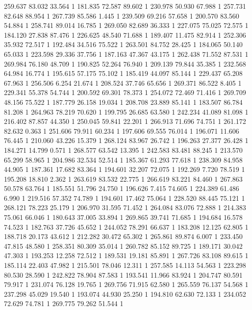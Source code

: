 	259.637	83.032	33.564	1
	181.835	72.587	89.602	1
	230.978	50.930	67.988	1
	257.731	82.648	88.954	1
	267.739	85.586	1.445	1
	239.509	69.216	57.658	1
	200.570	83.560	54.884	1
	258.741	89.014	16.785	1
	269.050	82.689	36.333	1
	227.075	75.025	72.575	1
	184.120	27.838	87.476	1
	226.625	48.540	71.688	1
	189.407	11.475	82.914	1
	252.306	35.932	72.517	1
	192.484	34.516	75.522	1
	263.501	84.752	28.425	1
	184.065	50.140	65.033	1
	223.598	29.336	37.756	1
	187.163	47.367	43.175	1
	262.438	71.552	87.531	1
	269.984	76.180	48.709	1
	190.825	52.264	76.940	1
	209.139	79.844	35.385	1
	232.568	64.984	16.774	1
	195.615	57.175	75.102	1
	185.419	44.097	85.144	1
	229.437	65.208	67.963	1
	256.506	6.254	21.674	1
	208.524	37.746	65.656	1
	269.371	86.522	8.405	1
	229.341	55.378	54.744	1
	200.592	69.301	78.373	1
	254.072	72.469	71.416	1
	269.709	48.156	75.522	1
	187.779	26.158	19.034	1
	208.708	23.889	85.141	1
	183.507	86.784	81.208	1
	264.963	78.219	70.620	1
	199.795	26.685	63.580	1
	242.234	41.089	81.098	1
	216.402	87.857	44.350	1
	250.045	59.841	22.201	1
	266.913	71.696	74.751	1
	261.172	82.632	0.363	1
	251.606	79.911	60.234	1
	197.606	69.555	76.014	1
	196.071	11.606	76.445	1
	210.060	43.226	15.379	1
	268.124	83.967	26.742	1
	196.263	27.377	26.428	1
	184.271	14.799	0.571	1
	268.577	63.542	13.395	1
	242.583	83.481	88.245	1
	213.570	65.299	58.965	1
	204.986	32.534	52.514	1
	185.367	61.293	77.618	1
	238.309	84.958	44.905	1
	187.361	17.682	83.364	1
	194.601	32.207	72.075	1
	192.269	7.720	78.519	1
	195.208	18.810	2.362	1
	263.619	83.532	22.775	1
	266.619	83.221	84.460	1
	267.863	50.578	63.764	1
	185.551	51.796	24.750	1
	196.626	7.415	74.605	1
	224.389	61.486	6.990	1
	219.516	57.352	74.789	1
	194.601	17.462	75.064	1
	228.520	88.445	75.121	1
	268.121	78.223	25.179	1
	206.970	31.595	71.452	1
	264.084	83.076	72.888	1
	214.383	75.061	66.046	1
	180.643	37.005	33.894	1
	269.865	39.741	71.685	1
	194.684	16.578	74.523	1
	182.763	37.726	45.652	1
	244.052	78.291	66.637	1
	183.208	12.125	62.805	1
	188.718	20.173	43.612	1
	212.282	30.472	65.302	1
	265.861	89.874	6.007	1
	233.450	47.815	48.580	1
	258.351	80.309	35.014	1
	260.782	85.152	89.725	1
	189.171	30.042	47.303	1
	193.253	12.258	72.512	1
	189.531	19.181	85.891	1
	267.726	83.108	89.615	1
	185.114	22.403	47.982	1
	215.501	78.046	12.311	1
	257.585	14.113	54.563	1
	223.298	80.530	28.590	1
	242.822	78.904	87.583	1
	193.541	11.966	83.924	1
	204.747	80.591	79.917	1
	231.074	76.128	19.765	1
	269.756	71.915	62.580	1
	265.559	76.137	54.568	1
	237.298	45.029	19.540	1
	193.074	44.930	25.250	1
	194.810	62.630	72.133	1
	234.052	72.629	74.781	1
	269.775	79.262	51.544	1

